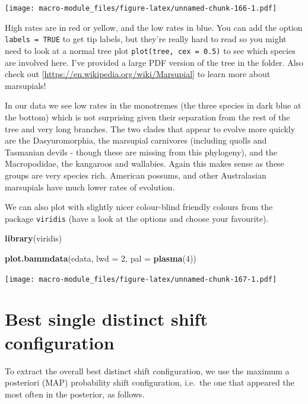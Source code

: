 \documentclass[]{book}
\newenvironment{Shaded}{\begin{snugshade}}{\end{snugshade}}
\newcommand{\KeywordTok}[1]{\textcolor[rgb]{0.13,0.29,0.53}{\textbf{{#1}}}}
\newcommand{\DataTypeTok}[1]{\textcolor[rgb]{0.13,0.29,0.53}{{#1}}}
\newcommand{\DecValTok}[1]{\textcolor[rgb]{0.00,0.00,0.81}{{#1}}}
\newcommand{\NormalTok}[1]{{#1}}
\begin{document}
\texttt{[image: macro-module\_files/figure-latex/unnamed-chunk-166-1.pdf]}

High rates are in red or yellow, and the low rates in blue. You can add
the option \texttt{labels\ =\ TRUE} to get tip labels, but they're
really hard to read so you might need to look at a normal tree plot
\texttt{plot(tree,\ cex\ =\ 0.5)} to see which species are involved
here. I've provided a large PDF version of the tree in the folder. Also
check out {[}\url{https://en.wikipedia.org/wiki/Marsupial}{]} to learn
more about marsupials!

In our data we see low rates in the monotremes (the three species in
dark blue at the bottom) which is not surprising given their separation
from the rest of the tree and very long branches. The two clades that
appear to evolve more quickly are the Dasyuromorphia, the marsupial
carnivores (including quolls and Tasmanian devils - though these are
missing from this phylogeny), and the Macropodidae, the kangaroos and
wallabies. Again this makes sense as these groups are very species rich.
American possums, and other Australasian marsupials have much lower
rates of evolution.

We can also plot with slightly nicer colour-blind friendly colours from
the package \texttt{viridis} (have a look at the options and choose your
favourite).

\begin{Shaded}
\begin{Highlighting}[]
\KeywordTok{library}\NormalTok{(viridis)}

\KeywordTok{plot.bammdata}\NormalTok{(edata, }\DataTypeTok{lwd =} \DecValTok{2}\NormalTok{, }\DataTypeTok{pal =} \KeywordTok{plasma}\NormalTok{(}\DecValTok{4}\NormalTok{))}
\end{Highlighting}
\end{Shaded}

\texttt{[image: macro-module\_files/figure-latex/unnamed-chunk-167-1.pdf]}

\section{Best single distinct shift
configuration}\label{best-single-distinct-shift-configuration}

To extract the overall best distinct shift configuration, we use the
maximum a posteriori (MAP) probability shift configuration, i.e.~the one
that appeared the most often in the posterior, as follows.
\end{document}
